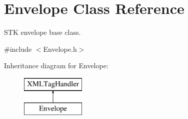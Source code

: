 \hypertarget{class_envelope}{}\section{Envelope Class Reference}
\label{class_envelope}


S\+TK envelope base class.  




{\ttfamily \#include $<$Envelope.\+h$>$}

Inheritance diagram for Envelope\+:\begin{figure}[H]
\begin{center}
\leavevmode
\includegraphics[height=2.000000cm]{class_envelope}
\end{center}
\end{figure}
